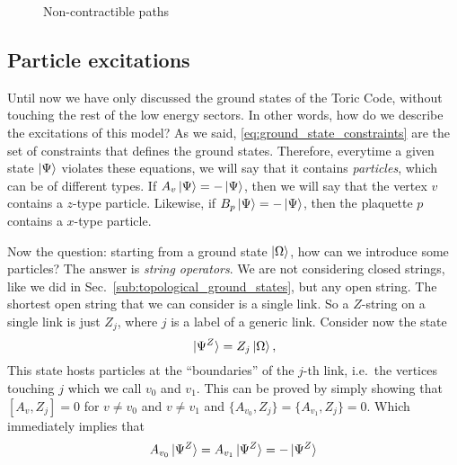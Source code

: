 \begin{figure}[t]
    \centering
    
    \caption{Non-contractible paths}
\end{figure}




\subsection{Particle excitations}%
\label{sub:particle_excitations}

Until now we have only discussed the ground states of the Toric Code, without touching the rest of the low energy sectors.
In other words, how do we describe the excitations of this model?
As we said, \eqref{eq:ground_state_constraints} are the set of constraints that defines the ground states.
Therefore, everytime a given state $\ket{\Psi}$ violates these equations, we will say that it contains \emph{particles}, which can be of different types.
If $A_v \ket{\Psi} = - \ket{\Psi}$, then we will say that the vertex $v$ contains a $z$-type particle.
Likewise, if $B_p \ket{\Psi} = - \ket{\Psi}$, then the plaquette $p$ contains a $x$-type particle.

Now the question: starting from a ground state $\ket{\Omega}$, how can we introduce some particles?
The answer is \emph{string operators}.
We are not considering closed strings, like we did in Sec.~\ref{sub:topological_ground_states}, but any open string.
The shortest open string that we can consider is a single link.
So a $Z$-string on a single link is just $Z_j$, where $j$ is a label of a generic link.
Consider now the state
\begin{equation}
    \ket*{\Psi^Z} = Z_j \ket{\Omega},
\end{equation}
This state hosts particles at the ``boundaries'' of the $j$-th link, i.e.~the vertices touching $j$ which we call $v_0$ and $v_1$.
This can be proved by simply showing that $[ A_v, Z_j ] = 0$ for $v \neq v_0$ and $v \neq v_1$ and $\{ A_{v_0}, Z_j \} = \{ A_{v_1}, Z_j \} = 0$.
Which immediately implies that
\begin{equation}
    A_{v_0} \ket*{\Psi^Z} = A_{v_1} \ket*{\Psi^Z} = - \ket*{\Psi^Z}
\end{equation}

